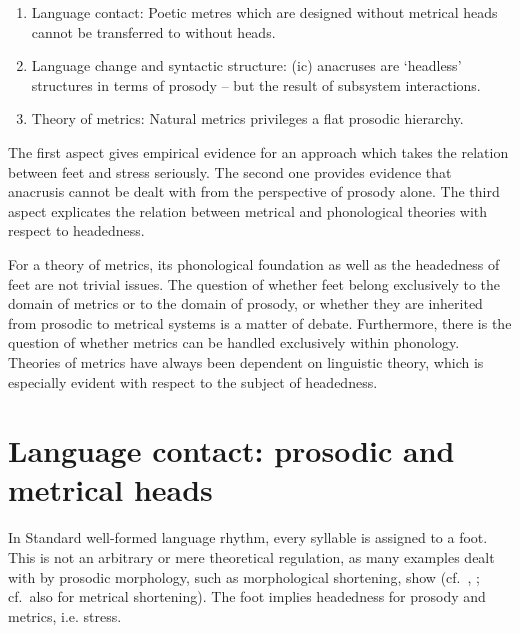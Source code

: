 \documentclass[output=paper
  ,nobabel
  ,uniformtopskip %
]{langscibook}
\begin{document}
\begin{sloppypar}
\begin{enumerate}
    \item Language contact: Poetic metres which are designed without metrical heads cannot be transferred to  without heads.

    \item Language change and syntactic structure: (ic) anacruses are `headless' structures in terms of prosody – but the result of subsystem interactions.

    \item Theory of metrics: Natural metrics privileges a flat prosodic hierarchy.
\end{enumerate}
\end{sloppypar}

\largerpage
\noindent
The first aspect gives empirical evidence for an approach which takes the relation between feet and stress seriously. The second one provides evidence that anacrusis cannot be dealt with from the perspective of prosody alone. The third aspect explicates the relation between metrical and phonological theories with respect to headedness.

For a theory of metrics, its phonological foundation as well as the headedness of feet are not trivial issues. The question of whether feet belong exclusively to the domain of metrics or to the domain of prosody, or whether they are inherited from prosodic to metrical systems is a matter of debate. Furthermore, there is the question of whether metrics can be handled exclusively within phonology. Theories of metrics have always been dependent on linguistic theory, which is especially evident with respect to the subject of headedness. 

\section{Language contact: prosodic and metrical heads}\label{sec-languagecontact}

In Standard  well-formed language rhythm, every syllable is assigned to a foot. This is not an
arbitrary or mere theoretical regulation, as many examples dealt with by prosodic morphology, such
as morphological shortening, show (cf.\ \eg \citealt{LibermanPrince1977}, \citealt{Vennemann1995};
cf.\ also \citealt{DresherLahiri2005} for metrical shortening). The foot implies headedness for
 prosody and metrics, i.e. stress.
\end{document}
